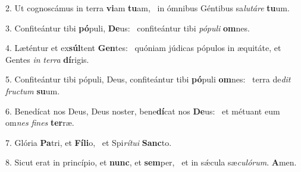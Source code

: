 2. Ut cognoscámus in terra \textbf{vi}am \textbf{tu}am, \ast\  in ómnibus Géntibus sa\textit{lu}\textit{tá}\textit{re} \textbf{tu}um.\

3. Confiteántur tibi \textbf{pó}puli, \textbf{De}us: \ast\  confiteántur tibi \textit{pó}\textit{pu}\textit{li} \textbf{om}nes.\

4. Læténtur et ex\textbf{súl}tent \textbf{Gen}tes: \ast\  quóniam júdicas pópulos in æquitáte, et Gentes \textit{in} \textit{ter}\textit{ra} \textbf{dí}rigis.\

5. Confiteántur tibi pópuli, Deus, confiteántur tibi \textbf{pó}puli \textbf{om}nes: \ast\  terra de\textit{dit} \textit{fruc}\textit{tum} \textbf{su}um.\

6. Benedícat nos Deus, Deus noster, bene\textbf{dí}cat nos \textbf{De}us: \ast\  et métuant eum om\textit{nes} \textit{fi}\textit{nes} \textbf{ter}ræ.\

7. Glória \textbf{Pa}tri, et \textbf{Fí}\textbf{li}o, \ast\  et Spi\textit{rí}\textit{tu}\textit{i} \textbf{Sanc}to.\

8. Sicut erat in princípio, et \textbf{nunc}, et \textbf{sem}per, \ast\  et in sǽcula sæ\textit{cu}\textit{ló}\textit{rum}. \textbf{A}men.\

